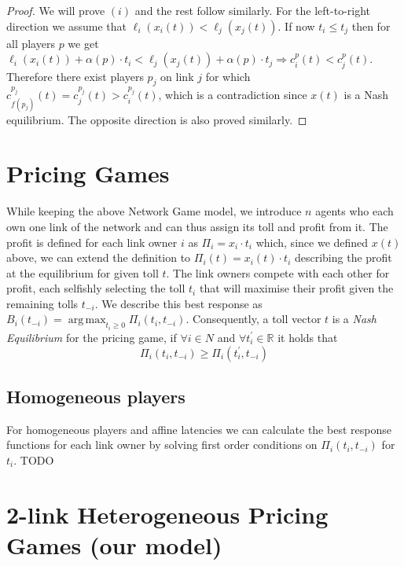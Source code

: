 \documentclass[10pt,a4paper]{book}
\newcommand{\R}{\mathbb{R}}
\DeclareMathOperator*{\argmax}{arg\,max}
\theoremstyle{definition}
\theoremstyle{comment}
\begin{document}
\begin{proof}
	We will prove $(i)$ and the rest follow similarly.
	For the left-to-right direction we assume that $\ell_i(x_i(t)) < \ell_j(x_j(t))$.
	If now $t_i \le t_j$ then for all players $p$ we get $\ell_i(x_i(t)) + \alpha(p) \cdot t_i < \ell_j(x_j(t)) + \alpha(p) \cdot t_j \Rightarrow c_i^p(t) < c_j^p(t)$.
	Therefore there exist players $p_j$ on link $j$ for which $c_{f(p_j)}^{p_j}(t) = c_j^{p_j}(t) > c_i^{p_j}(t)$, which is a contradiction since $x(t)$ is a Nash equilibrium.
	The opposite direction is also proved similarly.
\end{proof}

\section*{Pricing Games}

While keeping the above Network Game model, we introduce $n$ agents who each own one link of the network and can thus assign its toll and profit from it.
The profit is defined for each link owner $i$ as $\Pi_i = x_i \cdot t_i$ which, since we defined $x(t)$ above, we can extend the definition to $\Pi_i(t) = x_i(t) \cdot t_i$ describing the profit at the equilibrium for given toll $t$.
The link owners compete with each other for profit, each selfishly selecting the toll $t_i$ that will maximise their profit given the remaining tolls $t_{-i}$.
We describe this best response as $B_i(t_{-i}) = \argmax_{t_i \geq 0} \Pi_i(t_i, t_{-i})$.
Consequently, a toll vector $t$ is a \textit{Nash Equilibrium} for the pricing game, if $\forall i \in N$ and $\forall t_i^\prime \in \R$ it holds that
\[\Pi_i(t_i, t_{-i}) \geq \Pi_i(t_i^\prime, t_{-i})\]

\subsection*{Homogeneous players}

For homogeneous players and affine latencies we can calculate the best response functions for each link owner by solving first order conditions on $\Pi_i(t_i, t_{-i})$ for $t_i$. TODO

\section*{2-link Heterogeneous Pricing Games (our model)}
\end{document}

